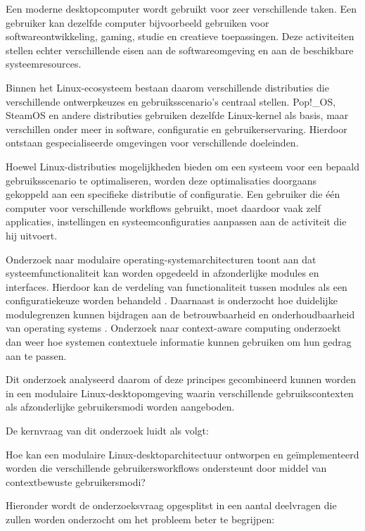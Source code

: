 \documentclass{hogent-article}
\begin{document}
Een moderne desktopcomputer wordt gebruikt voor zeer verschillende taken. Een gebruiker kan dezelfde computer bijvoorbeeld gebruiken voor softwareontwikkeling, gaming, studie en creatieve toepassingen. Deze activiteiten stellen echter verschillende eisen aan de softwareomgeving en aan de beschikbare systeemresources.

Binnen het Linux-ecosysteem bestaan daarom verschillende distributies die verschillende ontwerpkeuzes en gebruiksscenario's centraal stellen. Pop!\_OS, SteamOS en andere distributies gebruiken dezelfde Linux-kernel als basis, maar verschillen onder meer in software, configuratie en gebruikerservaring. Hierdoor ontstaan gespecialiseerde omgevingen voor verschillende doeleinden.

Hoewel Linux-distributies mogelijkheden bieden om een systeem voor een bepaald gebruiksscenario te optimaliseren, worden deze optimalisaties doorgaans gekoppeld aan een specifieke distributie of configuratie. Een gebruiker die één computer voor verschillende workflows gebruikt, moet daardoor vaak zelf applicaties, instellingen en systeemconfiguraties aanpassen aan de activiteit die hij uitvoert.

Onderzoek naar modulaire operating-system\-architecturen toont aan dat systeemfunctionaliteit kan worden opgedeeld in afzonderlijke modules en interfaces. Hierdoor kan de verdeling van functionaliteit tussen modules als een configuratiekeuze worden behandeld \autocite{Schubert2022}. Daarnaast is onderzocht hoe duidelijke modulegrenzen kunnen bijdragen aan de betrouwbaarheid en onderhoudbaarheid van operating systems \autocite{Witchel2003}. Onderzoek naar context-aware computing onderzoekt dan weer hoe systemen contextuele informatie kunnen gebruiken om hun gedrag aan te passen.

Dit onderzoek analyseerd daarom of deze principes gecombineerd kunnen worden in een modulaire Linux-desktopomgeving waarin verschillende gebruikscontexten als afzonderlijke gebruikersmodi worden aangeboden.

De kernvraag van dit onderzoek luidt als volgt:
\begin{tcolorbox}[colback=yellow!10]
    Hoe kan een modulaire Linux-desktoparchitectuur ontworpen en geïmplementeerd worden die verschillende gebruikersworkflows ondersteunt door middel van contextbewuste gebruikersmodi?
\end{tcolorbox}

Hieronder wordt de onderzoeksvraag opgesplitst in een aantal deelvragen die zullen worden onderzocht om het probleem beter te begrijpen:
\end{document}
